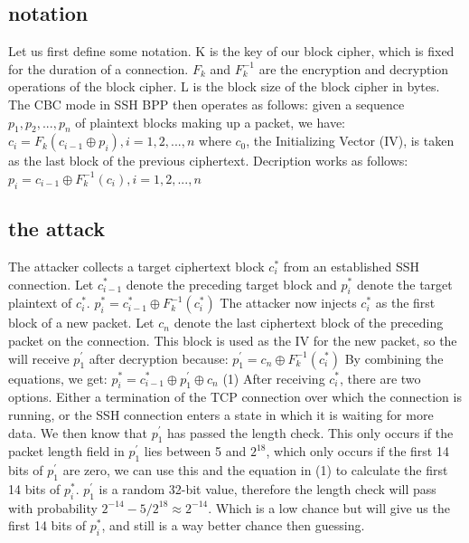 \documentclass[twocolumn]{article}
\begin{document}
\subsection{notation}
Let us first define some notation. K is the key of our block cipher, which is fixed for the duration of a connection. $F_k$ and $F^{-1}_k$ are the encryption and decryption operations of the block cipher. L is the block size of the block cipher in bytes. The CBC mode in SSH BPP then operates as follows: given a sequence $p_1,p_2,...,p_n$ of plaintext blocks making up a packet, we have: 
$c_i = F_k(c_{i-1} \oplus p_i), i = 1,2,...,n$
where $c_0$, the Initializing Vector (IV), is taken as the last block of the previous ciphertext. Decription works as follows:
$p_i = c_{i-1} \oplus F^{-1}_k(c_i), i = 1,2,...,n$
\subsection{the attack}
The attacker collects a target ciphertext block $c_i^*$ from an established SSH connection. Let $c_{i-1}^*$ denote the preceding target block and $p_i^*$ denote the target plaintext of $c_i^*$.
$p_i^* = c_{i-1}^* \oplus F^{-1}_k(c_i^*)$
The attacker now injects $c_i^*$ as the first block of a new packet. Let $c_n$ denote the last ciphertext block of the preceding packet on the connection. This block is used as the IV for the new packet, so the will receive $p^{'}_1$ after decryption because:
$p^{'}_1 = c_n \oplus F^{-1}_k(c_i^*)$
By combining the equations, we get:
$p_i^* = c_{i-1}^* \oplus p^{'}_1 \oplus c_n$ (1)
After receiving $c_i^*$, there are two options. Either a termination of the TCP connection over which the connection is running, or the SSH connection enters a state in which it is waiting for more data. We then know that $p^{'}_1$ has passed the length check. This only occurs if the packet length field in $p^{'}_1$ lies between 5 and $2^{18}$, which only occurs if the first 14 bits of $p^{'}_1$ are zero, we can use this and the equation in (1) to calculate the first 14 bits of $p_i^*$. $p^{'}_1$ is a random 32-bit value, therefore the length check will pass with probability $2^{-14} - 5/2^{18} \approx 2^{-14}$. Which is a low chance but will give us the first 14 bits of $p^*_i$, and still is a way better chance then guessing.
\end{document}
